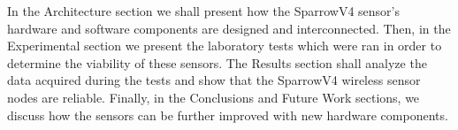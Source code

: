 In the Architecture section we shall present how the SparrowV4 sensor's hardware and software components are designed and interconnected.
Then, in the Experimental section we present the laboratory tests which were ran in order to determine the viability of these sensors.
The Results section shall analyze the data acquired during the tests and show that the SparrowV4 wireless sensor nodes are reliable. Finally, 
in the Conclusions and Future Work sections, we discuss how the sensors can be further improved with new hardware components.
